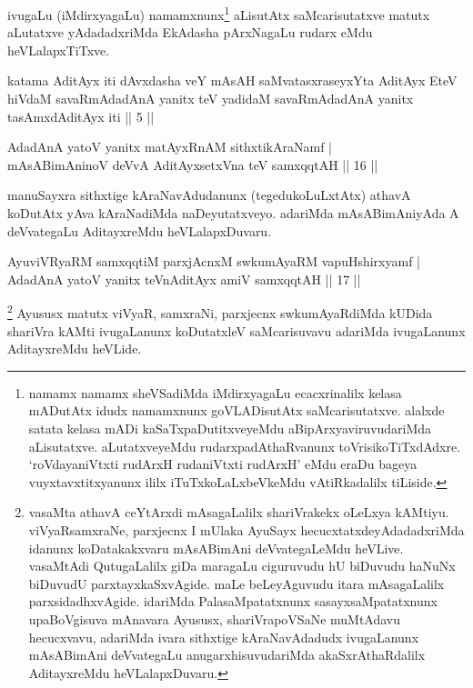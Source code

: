 \begin{artha}
ivugaLu (iMdirxyagaLu) namamxnunx\footnote{namamx namamx sheVSadiMda iMdirxyagaLu ecacxrinalilx kelasa mADutAtx idudx namamxnunx goVLADisutAtx saMcarisutatxve. alalxde satata kelasa mADi kaSaTxpaDutitxveyeMdu aBipArxyaviruvudariMda aLisutatxve. aLutatxveyeMdu rudarxpadAthaRvanunx toVrisikoTiTxdAdxre. `roVdayaniVtxti rudArxH rudaniVtxti rudArxH' eMdu eraDu bageya vuyxtavxtitxyanunx ililx iTuTxkoLaLxbeVkeMdu vAtiRkadalilx tiLiside.} aLisutAtx saMcarisutatxve matutx aLutatxve yAdadadxriMda EkAdasha pArxNagaLu rudarx eMdu heVLalapxTiTxve.
\end{artha}



\begin{kandikeshl}
katama AditAyx iti dAvxdasha veY mAsAH saMvatasxraseyxYta AditAyx EteV hiVdaM savaRmAdadAnA yanitx teV yadidaM savaRmAdadAnA yanitx tasAmxdAditAyx iti || 5 ||
\end{kandikeshl}

\begin{shl}
AdadAnA yatoV yanitx matAyxRnAM sithxtikAraNamf |\\
mAsABimAninoV deVvA AditAyxsetxVna teV samxqqtAH \hfill || 16 ||
\end{shl}

\begin{artha}
manuSayxra sithxtige kAraNavAdudanunx (tegedukoLuLxtAtx) athavA koDutAtx yAva kAraNadiMda naDeyutatxveyo. adariMda mAsABimAniyAda A deVvategaLu AditayxreMdu heVLalapxDuvaru.
\end{artha}%


\begin{shl}
AyuviVRyaRM samxqqtiM parxjAcnxM swkumAyaRM vapuHshirxyamf |\\
AdadAnA yatoV yanitx teVnA\s \s ditAyx amiV samxqqtAH \hfill || 17 ||
\end{shl}

\begin{artha}
\footnote{vasaMta athavA ceYtArxdi mAsagaLalilx shariVrakekx oLeLxya kAMtiyu. viVyaRsamxraNe, parxjecnx I mUlaka AyuSayx hecucxtatxdeyAdadadxriMda idanunx koDatakakxvaru mAsABimAni deVvategaLeMdu heVLive. vasaMtAdi QutugaLalilx giDa maragaLu ciguruvudu hU biDuvudu haNuNx biDuvudU parxtayxkaSxvAgide. maLe beLeyAguvudu itara mAsagaLalilx parxsidadhxvAgide. idariMda PalasaMpatatxnunx sasayxsaMpatatxnunx upaBoVgisuva mAnavara Ayususx, shariVrapoVSaNe muMtAdavu hecucxvavu, adariMda ivara sithxtige kAraNavAdadudx ivugaLanunx mAsABimAni deVvategaLu anugarxhisuvudariMda akaSxrAthaRdalilx AditayxreMdu heVLalapxDuvaru.} Ayususx matutx viVyaR, samxraNi, parxjecnx swkumAyaRdiMda kUDida shariVra kAMti ivugaLanunx koDutatxleV saMcarisuvavu adariMda ivugaLanunx AditayxreMdu heVLide.
\end{artha}

